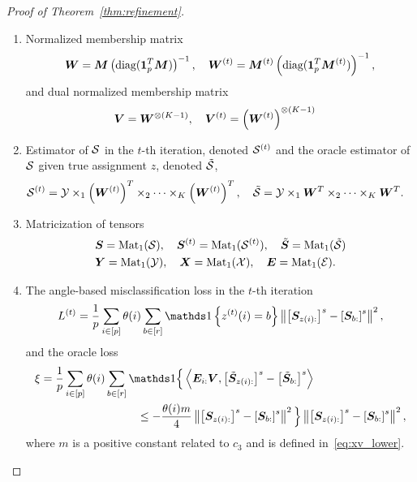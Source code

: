 \documentclass[lettersize,journal]{IEEEtran}
\theoremstyle{definition}
\theoremstyle{definition}
\newcommand{\of}[1]{\left(#1\right)}
\newcommand{\off}[1]{\left[#1\right]}
\newcommand{\offf}[1]{\left\{#1\right\}}
\newcommand{\ang}[1]{\left\langle#1\right\rangle}
\def\fixme#1#2{\textbf{\color{red}[FIXME (#1): #2]}}
\begin{document}
\begin{proof}[Proof of Theorem~\ref{thm:refinement}]
\begin{enumerate}
    \item Normalized membership matrix
    \begin{align}
        \mW = \mM \of{ \text{diag}(\mone_{p}^T \mM) }^{-1}, \quad \mW^{(t)} = \mM^{(t)} \of{ \text{diag}(\mone_{p}^T \mM^{(t)}) }^{-1},
    \end{align}
    and dual normalized membership matrix
    \begin{align}
         \mV &= \mW^{\otimes (K-1)}, \quad \mV^{(t)} =\of{ \mW^{(t)}}^{\otimes (K-1)}
    \end{align}
    \item Estimator of $\mathcal{S}$ in the $t$-th iteration, denoted $\mathcal{S}^{(t)}$ and the oracle estimator of $\mathcal{S}$ given true assignment $z$, denoted $\tilde {\mathcal{S}}$,
    \begin{align}
        \tS^{(t)} = \tY \times_1 \of{\mW^{(t)}}^T \times_2 \cdots \times_K \of{\mW^{(t)}}^T, \quad \tilde \tS &= \tY \times_1 \mW^T \times_2 \cdots \times_K \mW^T.
    \end{align}
    \item Matricization of tensors
    \begin{align}
        &\bm S = \text{Mat}_1(\mathcal{S}), \quad \bm S^{(t)} = \text{Mat}_1(\mathcal{S}^{(t)}), \quad \tilde {\bm S} = \text{Mat}_1(\tilde {\mathcal{S}})\\
        &\bm Y = \text{Mat}_1(\mathcal{Y}), \quad \bm X = \text{Mat}_1(\mathcal{X}), \quad \bm{E} = \text{Mat}_1(\mathcal{E}).
    \end{align}
    \item The angle-based misclassification loss in the $t$-th iteration %
    \begin{equation}
         L^{(t)} = \frac{1}{p}  \sum_{i \in [p]} \theta(i) \sum_{b \in [r]}  \ind \offf{ z^{(t)}(i) = b } \onorm{ \off{ \mS_{ z(i):}  }^s - \off{ \mS_{b:}  }^s  }^2,
    \end{equation}
     and the oracle loss
    \begin{align}
         \xi & = \frac{1}{p} \sum_{i \in [p]} \theta(i) \sum_{b \in [r]} \ind \Big\{\ang{ \mE_{i:} \mV, \off{  \tilde \mS_{z(i):} }^s - \off{  \tilde \mS_{b:} }^s} \\
         & \hspace{3cm}\leq - \frac{ \theta(i) m}{4} \onorm{ \off{ \mS_{z(i):}  }^s - \off{ \mS_{b:}  }^s  }^2 \Big\} \onorm{ \off{ \mS_{z(i):}  }^s - \off{ \mS_{ b:}  }^s  }^2,
    \end{align}
    where $m$ is a positive constant related to $c_3$ and is defined in~\eqref{eq:xv_lower}.
\end{enumerate}


\end{proof}
\end{document}
